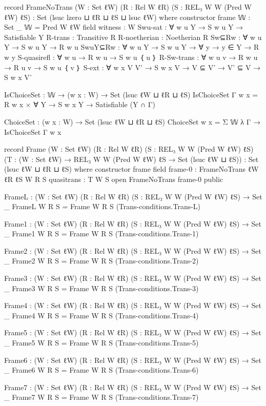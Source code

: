 \begin{spverbatim}
record FrameNoTrans (W : Set ℓW) (R : Rel W ℓR) (S : REL₃ W W (Pred W ℓW) ℓS)
  : Set (lsuc lzero ⊔ ℓR ⊔ ℓS ⊔ lsuc ℓW) where
  constructor frame
  𝕎 : Set _
  𝕎 = Pred W ℓW
  field
    witness : W
    Swu-sat : ∀ {w u Y} → S w u Y → Satisfiable Y
    R-trans : Transitive R
    R-noetherian : Noetherian R
    Sw⊆Rw : ∀ {w u Y} → S w u Y → R w u
    SwuY⊆Rw : ∀ {w u Y} → S w u Y → ∀ {y} → y ∈ Y → R w y
    S-quasirefl : ∀ {w u} → R w u → S w u ｛ u ｝
    R-Sw-trans : ∀ {w u v} → R w u → R u v → S w u ｛ v ｝
    S-ext : ∀ {w x V V'} → S w x V → V ⊆ V' → V' ⊆ V → S w x V'

  IsChoiceSet : 𝕎 → (w x : W) → Set (lsuc ℓW ⊔ ℓR ⊔ ℓS)
  IsChoiceSet Γ w x = R w x × ∀ {Y} → S w x Y → Satisfiable (Y ∩ Γ)

  ChoiceSet : (w x : W) → Set (lsuc ℓW ⊔ ℓR ⊔ ℓS)
  ChoiceSet w x = Σ 𝕎 λ Γ → IsChoiceSet Γ w x

record Frame (W : Set ℓW) (R : Rel W ℓR) (S : REL₃ W W (Pred W ℓW) ℓS)
  (T : (W : Set ℓW) → REL₃ W W (Pred W ℓW) ℓS → Set (lsuc ℓW ⊔ ℓS))
  : Set (lsuc ℓW ⊔ ℓR ⊔ ℓS) where
  constructor frame
  field
    frame-0 : FrameNoTrans {ℓW} {ℓR} {ℓS} W R S
    quasitrans : T W S
  open FrameNoTrans frame-0 public

FrameL : (W : Set ℓW) (R : Rel W ℓR) (S : REL₃ W W (Pred W ℓW) ℓS) → Set _
FrameL W R S = Frame W R S (Trans-conditions.Trans-L)

Frame1 : (W : Set ℓW) (R : Rel W ℓR) (S : REL₃ W W (Pred W ℓW) ℓS) → Set _
Frame1 W R S = Frame W R S (Trans-conditions.Trans-1)

Frame2 : (W : Set ℓW) (R : Rel W ℓR) (S : REL₃ W W (Pred W ℓW) ℓS) → Set _
Frame2 W R S = Frame W R S (Trans-conditions.Trans-2)

Frame3 : (W : Set ℓW) (R : Rel W ℓR) (S : REL₃ W W (Pred W ℓW) ℓS) → Set _
Frame3 W R S = Frame W R S (Trans-conditions.Trans-3)

Frame4 : (W : Set ℓW) (R : Rel W ℓR) (S : REL₃ W W (Pred W ℓW) ℓS) → Set _
Frame4 W R S = Frame W R S (Trans-conditions.Trans-4)

Frame5 : (W : Set ℓW) (R : Rel W ℓR) (S : REL₃ W W (Pred W ℓW) ℓS) → Set _
Frame5 W R S = Frame W R S (Trans-conditions.Trans-5)

Frame6 : (W : Set ℓW) (R : Rel W ℓR) (S : REL₃ W W (Pred W ℓW) ℓS) → Set _
Frame6 W R S = Frame W R S (Trans-conditions.Trans-6)

Frame7 : (W : Set ℓW) (R : Rel W ℓR) (S : REL₃ W W (Pred W ℓW) ℓS) → Set _
Frame7 W R S = Frame W R S (Trans-conditions.Trans-7)


\end{spverbatim}
